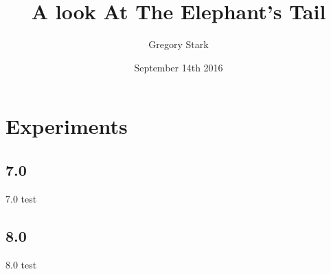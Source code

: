 \documentclass[t,10pt]{beamer}
\title{A look At The Elephant's Tail}
\author{Gregory Stark}
\date{September 14th 2016}
\begin{document}
\section{Experiments}
\subsection{7.0}
\begin{frame}
7.0 test
\end{frame}
\subsection{8.0}
\begin{frame}
8.0 test
\end{frame}
\end{document}
